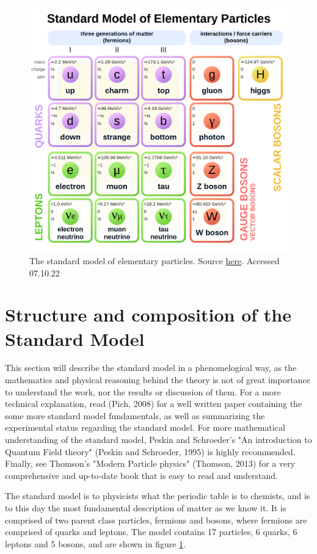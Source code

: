 
\begin{figure}[h!]
    \includegraphics[width=\linewidth]{Figures/SM/Standard_Model_of_Elementary_Particles.svg.png}
    \caption{The standard model of elementary particles. Source \href{https://upload.wikimedia.org/wikipedia/commons/thumb/0/00/Standard_Model_of_Elementary_Particles.svg/1200px-Standard_Model_of_Elementary_Particles.svg.png}{here}. Accessed 07.10.22}
    \label{fig:smdiagram}
\end{figure}

\section{Structure and composition of the Standard Model}
This section will describe the standard model in a phenomelogical way, as the mathematics and physical reasoning behind the theory is not of great 
importance to understand the work, nor the results or discussion of them. For a more technical explanation, read (Pich, 2008)\cite{Pich:819632} for a 
well written paper containing the some more standard model fundamentals, as well as summarizing the experimental status regarding the standard model.
For more mathematical understanding of the standard model, Peskin and Schroeder's "An introduction to Quantum Field theory" (Peskin and Schroeder, 1995)\cite{Peskin:1995ev}
 is highly recommended. Finally, see Thomson's "Modern Particle physics" (Thomson, 2013)\cite{Thomson:2013zua} for a very comprehensive and up-to-date book that is easy to read and understand. \par
The standard model is to physicists what the periodic table is to chemists, and is to this day the most fundamental description of matter as we know it. 
It is comprised of two parent class particles, fermions and bosons, where fermions are comprised of quarks and leptons. The model contains 
17 particles, 6 quarks, 6 leptons and 5 bosons, and are shown in figure \ref{fig:smdiagram}.



